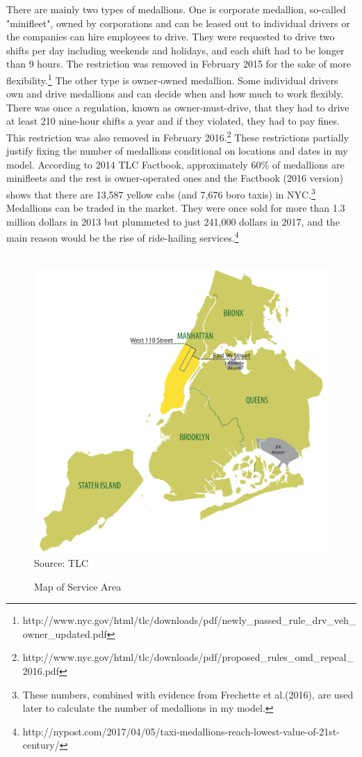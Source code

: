 There are mainly two types of medallions. One is corporate medallion, so-called "minifleet", owned by corporations and can be leased out to individual drivers or the companies can hire employees to drive. They were requested to drive two shifts per day including weekends and holidays, and each shift had to be longer than 9 hours. The restriction was removed in February 2015 for the sake of more flexibility.\footnote{http://www.nyc.gov/html/tlc/downloads/pdf/newly\_passed\_rule\_drv\_veh\_owner\_updated.pdf} The other type is owner-owned medallion. Some individual drivers own and drive medallions and can decide when and how much to work flexibly. There was once a regulation, known as owner-must-drive, that they had to drive at least 210 nine-hour shifts a year and if they violated, they had to pay fines. This restriction was also removed in February 2016.\footnote{http://www.nyc.gov/html/tlc/downloads/pdf/proposed\_rules\_omd\_repeal\_2016.pdf} These restrictions partially justify fixing the number of medallions conditional on locations and dates in my model. According to 2014 TLC Factbook, approximately 60\% of medallions are minifleets and the rest is owner-operated ones and the Factbook (2016 version) shows that there are 13,587 yellow cabs (and 7,676 boro taxis) in NYC.\footnote{These numbers, combined with evidence from Frechette et al.(2016), are used later to calculate the number of medallions in my model.} Medallions can be traded in the market. They were once sold for more than 1.3 million dollars in 2013 but plummeted to just 241,000 dollars in 2017, and the main reason would be the rise of ride-hailing services.\footnote{http://nypost.com/2017/04/05/taxi-medallions-reach-lowest-value-of-21st-century/}

\begin{figure}[h]
\centering
\caption{Map of Service Area}\label{fig:map_service_area}\\
\vspace{0.2cm}
\includegraphics[width=12cm]{Figures/map_service_area.png}
{\footnotesize \noindent Source: TLC}
\end{figure}


